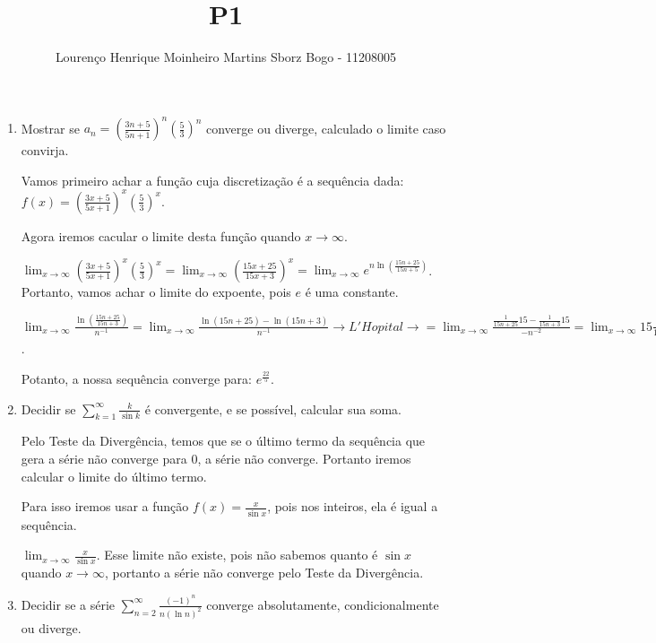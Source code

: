 \documentclass[12pt]{article}
\title{P1}
\author{Lourenço Henrique Moinheiro Martins Sborz Bogo - 11208005}
\date{}
\newcommand{\gsum}[3]{\displaystyle\sum_{#1}^#2 #3}
\begin{document}
\maketitle

\begin{enumerate}
  
\item Mostrar se $a_n = (\frac{3n+5}{5n+1})^n(\frac{5}{3})^n$ converge ou diverge, calculado o limite caso convirja.

  Vamos primeiro achar a função cuja discretização é a sequência dada: $f(x) = (\frac{3x+5}{5x+1})^x(\frac{5}{3})^x$.

  Agora iremos cacular o limite desta função quando $x \to \infty$.

  $\displaystyle\lim_{x \to \infty}(\frac{3x+5}{5x+1})^x(\frac{5}{3})^x = \displaystyle\lim_{x \to \infty}(\frac{15x+25}{15x+3})^x = \displaystyle\lim_{x \to \infty}e^{n\ln{(\frac{15n+25}{15n+5})}}$.
  Portanto, vamos achar o limite do expoente, pois $e$ é uma constante.

  $\displaystyle\lim_{x \to \infty}\frac{\ln{(\frac{15n+25}{15n+3})}}{n^{-1}} = \displaystyle\lim_{x \to \infty}\frac{\ln{(15n+25)}-\ln{(15n+3)}}{n^{-1}} \rightarrow L'Hopital \rightarrow = \displaystyle\lim_{x \to \infty}\frac{\frac{1}{15n+25}15 - \frac{1}{15n+3}15}{-n^{-2}} = \displaystyle\lim_{x \to \infty}15\frac{22n^2}{15n^2+15n28+75} = \displaystyle\lim_{x \to \infty}\frac{22}{15+\frac{28}{n}+\frac{5}{n^2}} = \frac{22}{5}$.

  Potanto, a nossa sequência converge para: $e^\frac{22}{5}$.

\item Decidir se $\gsum{k=1}{\infty}{\frac{k}{\sin{k}}}$ é convergente, e se possível, calcular sua soma.

  Pelo Teste da Divergência, temos que se o último termo da sequência que gera a série não converge para 0, a série não converge. Portanto iremos calcular o limite do último termo.

  Para isso iremos usar a função $f(x) = \frac{x}{\sin{x}}$, pois nos inteiros, ela é igual a sequência.

  $\displaystyle\lim_{x \to \infty}\frac{x}{\sin{x}}$. Esse limite não existe, pois não sabemos quanto é $\sin{x}$ quando $x \to \infty$, portanto a série não converge pelo Teste da Divergência.

\item Decidir se a série $\gsum{n=2}{\infty}{\frac{(-1)^n}{n(\ln{n})^2}}$ converge absolutamente, condicionalmente ou diverge.


\end{enumerate}
\end{document}
